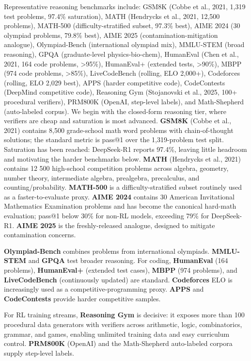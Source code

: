 \documentclass{article}
\begin{document}
Representative reasoning benchmarks include: GSM8K (Cobbe et al., 2021, 1,319 test problems, 97.4\% saturation), MATH (Hendrycks et al., 2021, 12,500 problems), MATH-500 (difficulty-stratified subset, 97.3\% best), AIME 2024 (30 olympiad problems, 79.8\% best), AIME 2025 (contamination-mitigation analogue), Olympiad-Bench (international olympiad mix), MMLU-STEM (broad reasoning), GPQA (graduate-level physics-bio-chem), HumanEval (Chen et al., 2021, 164 code problems, \textgreater95\%), HumanEval+ (extended tests, \textgreater90\%), MBPP (974 code problems, \textgreater85\%), LiveCodeBench (rolling, ELO 2,000+), Codeforces (rolling, ELO 2,029 best), APPS (harder competitive code), CodeContests (DeepMind competitive code), Reasoning Gym (Stojanovski et al., 2025, 100+ procedural verifiers), PRM800K (OpenAI, step-level labels), and Math-Shepherd (auto-labeled corpus). We begin with the closed-form reasoning tier, where verifiers are cheap and saturation is most advanced. \textbf{GSM8K} (Cobbe et al., 2021) contains 8,500 grade-school math word problems with chain-of-thought solutions; the standard metric is pass@1 over the 1,319-problem test split. Saturation has been reached: DeepSeek-R1 reports 97.4\%, leaving little headroom and motivating the harder benchmarks below. \textbf{MATH} (Hendrycks et al., 2021) contains 12 500 high-school competition problems across algebra, geometry, number theory, intermediate algebra, prealgebra, precalculus, and counting/probability. \textbf{MATH-500} is a difficulty-stratified subset routinely used as a faster-to-evaluate proxy. \textbf{AIME 2024} contains 30 American Invitational Mathematics Examination problems and has become the canonical hard-math evaluation; pass@1 below 30\% for non-RL models, exceeding 79\% for DeepSeek-R1. \textbf{AIME 2025} is the freshly-released analogue, designed to mitigate contamination concerns.

\textbf{Olympiad-Bench} combines problems from international olympiads. \textbf{MMLU-STEM} and \textbf{GPQA} test broader reasoning. For coding, \textbf{HumanEval} (164 problems), \textbf{HumanEval+} (extended test cases), \textbf{MBPP} (974 problems), and \textbf{LiveCodeBench} (continuously updated) are standard. \textbf{Codeforces} ELO is increasingly used as a competitive-programming proxy. \textbf{APPS} and \textbf{CodeContests} provide harder competitive samples.

For RL training streams, \textbf{Reasoning Gym} \citep{stojanovski20252025} is decisive: it exposes more than 100 procedural data generators with verifiers across arithmetic, logic, combinatorics, grammar, and games, enabling unlimited training data and easy curriculum control. \textbf{PRM800K} (OpenAI) and the Math-Shepherd auto-labeled corpora supply step-level labels.
\end{document}
